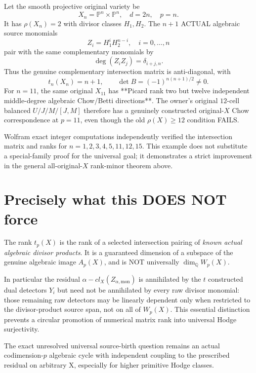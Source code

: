 \documentclass[11pt]{article}
\begin{document}
Let the smooth projective original variety be
\[
X_n=\mathbb P^n\times\mathbb P^n,\quad d=2n,\quad p=n.
\]
It has $\rho(X_n)=2$ with divisor classes $H_1,H_2$.
The $n+1$ ACTUAL algebraic source monomials
\[
Z_i=H_1^i H_2^{n-i},\quad i=0,\ldots,n
\]
pair with the same complementary monomials by
\[
\deg(Z_iZ_j)=\delta_{i+j,n}.
\]
Thus the genuine complementary intersection
matrix is anti-diagonal, with
\[
t_n(X_n)=n+1,\qquad
\det B=(-1)^{n(n+1)/2}\ne0.
\]
For $n=11$, the same original $X_{11}$ has
**Picard rank two but twelve independent
middle-degree algebraic Chow/Betti directions**.
The owner's original $12$-cell balanced $U/J/M/[J,M]$
therefore has a genuinely constructed original-$X$
Chow correspondence at $p=11$,
even though the old $\rho(X)\ge12$ condition FAILS.

Wolfram exact integer computations independently
verified the intersection matrix and ranks for
$n=1,2,3,4,5,11,12,15$.
This example does not substitute a special-family
proof for the universal goal; it demonstrates a
strict improvement in the general all-original-$X$
rank-minor theorem above.

\section{Precisely what this DOES NOT force}

The rank $t_p(X)$ is the rank of a selected
intersection pairing of \emph{known actual
algebraic divisor products}. It is a guaranteed
dimension of a subspace of the genuine algebraic
image $A_p(X)$, and is NOT universally
$\dim_\mathbb Q W_p(X)$.

In particular the residual
$\alpha-cl_X(Z_{\alpha,\mathrm{mon}})$
is annihilated by the $t$ constructed
dual detectors $Y_i$ but need not be
annihilated by every raw divisor monomial:
those remaining raw detectors may be
linearly dependent only when restricted to
the divisor-product source span, not on all
of $W_p(X)$. This essential distinction
prevents a circular promotion of numerical
matrix rank into universal Hodge surjectivity.

The exact unresolved universal source-birth
question remains an actual codimension-$p$
algebraic cycle with independent coupling
to the prescribed residual on arbitrary X,
especially for higher primitive Hodge classes.
\end{document}
